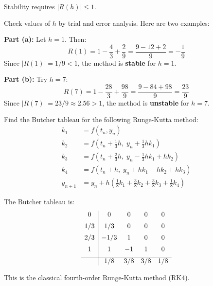 \documentclass[reqno, answers]{exam}
\begin{document}
\begin{questions}
\begin{solution}
Stability requires $|R(h)| \leq 1$.

Check values of $h$ by trial and error analysis. Here are two examples:

\textbf{Part (a):} Let $h = 1$. Then:
$$R(1) = 1 - \frac{4}{3} + \frac{2}{9} = \frac{9 - 12 + 2}{9} = -\frac{1}{9}$$
Since $|R(1)| = 1/9 < 1$, the method is \textbf{stable} for $h = 1$.

\textbf{Part (b):} 
Try $h = 7$:
$$R(7) = 1 - \frac{28}{3} + \frac{98}{9} = \frac{9 - 84 + 98}{9} = \frac{23}{9}$$
Since $|R(7)| = 23/9 \approx 2.56 > 1$, the method is \textbf{unstable} for $h = 7$.
\end{solution}

\newpage 

\question[5]
Find the Butcher tableau for the following Runge-Kutta method:
\begin{align*}
k_1 &= f(t_n, y_n)\\
k_2 &= f\!\left(t_n + \tfrac{1}{3}h,\; y_n + \tfrac{1}{3}h k_1\right)\\
k_3 &= f\!\left(t_n + \tfrac{2}{3}h,\; y_n - \tfrac{1}{3}h k_1 + h k_2\right)\\
k_4 &= f(t_n + h,\; y_n + h k_1 - h k_2 + h k_3)\\
y_{n+1} &= y_n + h\left(\tfrac{1}{8}k_1 + \tfrac{3}{8}k_2 + \tfrac{3}{8}k_3 + \tfrac{1}{8}k_4\right)
\end{align*}

\begin{solution}
The Butcher tableau is:
\begin{equation*}
\begin{array}{c|cccc}
0   & 0    & 0    & 0   & 0   \\[0.5em]
1/3 & 1/3  & 0    & 0   & 0   \\[0.5em]
2/3 & -1/3 & 1    & 0   & 0   \\[0.5em]
1   & 1    & -1   & 1   & 0   \\[0.5em]
\hline
    & 1/8  & 3/8  & 3/8 & 1/8 \\
\end{array}
\end{equation*}

This is the classical fourth-order Runge-Kutta method (RK4).
\end{solution}

\end{questions}
\end{document}
